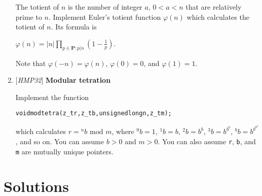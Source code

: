\begin{enumerate}[label=\textbf{\arabic*}.]
The totient of $n$ is the number of integer $a$,
$0 < a < n$ that are relatively prime to $n$.
Implement Euler's totient function $\varphi(n)$
which calculates the totient of $n$. Its
formula is

\( \displaystyle{
    \varphi(n) = |n| \prod_{p \in \textbf{P} : p | n}
    \left ( 1 - \frac{1}{p} \right ).
}\)

Note that $\varphi(-n) = \varphi(n)$, $\varphi(0) = 0$,
and $\varphi(1) = 1$.



\item {[\textit{HMP32}]} \textbf{Modular tetration}

Implement the function

\vspace{-1em}
\begin{alltt}
   void modtetra(z_t r, z_t b, unsigned long n, z_t m);
\end{alltt}
\vspace{-1em}

\noindent
which calculates $r = {}^n{}b \text{ mod } m$, where
${}^0{}b = 1$, ${}^1{}b = b$, ${}^2{}b = b^b$,
${}^3{}b = b^{b^b}$, ${}^b{}b = b^{b^{b^b}}$, and so on.
You can assume $b > 0$ and $m > 0$. You can also assume
\texttt{r}, \texttt{b}, and \texttt{m} are mutually
unique pointers.


\end{enumerate}



\chapter{Solutions}
\label{chap:Solutions}


